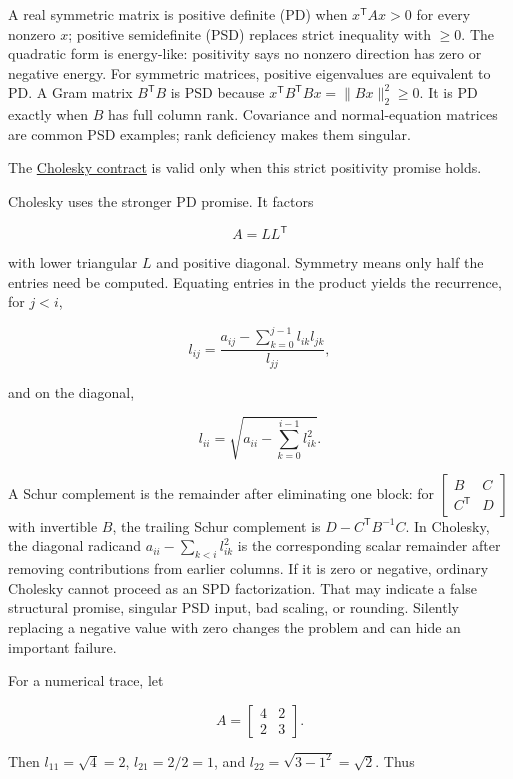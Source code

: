 A real symmetric matrix is positive definite (PD) when \(x^\mathsf T A x>0\) for every nonzero \(x\); positive semidefinite (PSD) replaces strict inequality with \(\ge0\). The quadratic form is energy-like: positivity says no nonzero direction has zero or negative energy. For symmetric matrices, positive eigenvalues are equivalent to PD. A Gram matrix \(B^\mathsf T B\) is PSD because \(x^\mathsf T B^\mathsf T Bx=\|Bx\|_2^2\ge0\). It is PD exactly when \(B\) has full column rank. Covariance and normal-equation matrices are common PSD examples; rank deficiency makes them singular.

The \hyperref[01-foundations-i-ch020-positive-definiteness-is-a-structural-promise]{Cholesky contract} is valid only when this strict positivity promise holds.

Cholesky uses the stronger PD promise. It factors

\[
A=LL^\mathsf T
\]

with lower triangular \(L\) and positive diagonal. Symmetry means only half the entries need be computed. Equating entries in the product yields the recurrence, for \(j<i\),

\[
l_{ij}=\frac{a_{ij}-\sum_{k=0}^{j-1}l_{ik}l_{jk}}{l_{jj}},
\]

and on the diagonal,

\[
l_{ii}=\sqrt{a_{ii}-\sum_{k=0}^{i-1}l_{ik}^2}.
\]

A Schur complement is the remainder after eliminating one block: for \(\begin{bmatrix}B&C\\C^\mathsf T&D\end{bmatrix}\) with invertible \(B\), the trailing Schur complement is \(D-C^\mathsf TB^{-1}C\). In Cholesky, the diagonal radicand \(a_{ii}-\sum_{k<i}l_{ik}^2\) is the corresponding scalar remainder after removing contributions from earlier columns. If it is zero or negative, ordinary Cholesky cannot proceed as an SPD factorization. That may indicate a false structural promise, singular PSD input, bad scaling, or rounding. Silently replacing a negative value with zero changes the problem and can hide an important failure.

For a numerical trace, let

\[
A=\begin{bmatrix}4&2\\2&3\end{bmatrix}.
\]

Then \(l_{11}=\sqrt4=2\), \(l_{21}=2/2=1\), and \(l_{22}=\sqrt{3-1^2}=\sqrt2\). Thus

